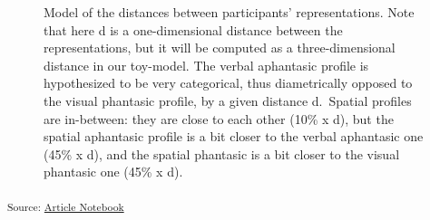 \documentclass[
  authoryear]{elsarticle}
\begin{document}
\begin{figure}


\caption{\label{fig-distances-graph}Model of the distances between
participants' representations. Note that here d is a one-dimensional
distance between the representations, but it will be computed as a
three-dimensional distance in our toy-model. The verbal aphantasic
profile is hypothesized to be very categorical, thus diametrically
opposed to the visual phantasic profile, by a given distance d.~Spatial
profiles are in-between: they are close to each other (10\% x d), but
the spatial aphantasic profile is a bit closer to the verbal aphantasic
one (45\% x d), and the spatial phantasic is a bit closer to the visual
phantasic one (45\% x d).}

\end{figure}%

\textsubscript{Source:
\href{https://m-delem.github.io/2499-similarity-manuscript/index.qmd.html}{Article
Notebook}}
\end{document}
